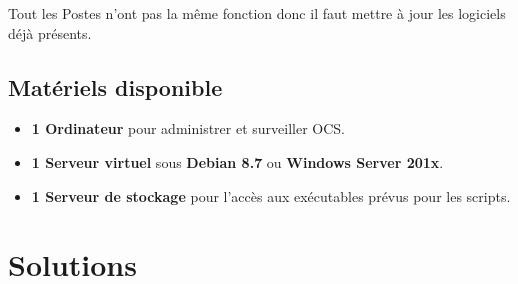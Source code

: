 \documentclass[11pt,a4paper,oneside]{article}
\begin{document}
Tout les Postes n'ont pas la même fonction donc il faut mettre à jour les logiciels déjà présents.

\subsection{Matériels disponible}
\begin{itemize}
	\item \textbf{1 Ordinateur} pour administrer et surveiller OCS.
	\item \textbf{1 Serveur virtuel} sous \textbf{Debian 8.7} ou \textbf{Windows Server 201x}.
	\item \textbf{1 Serveur de stockage} pour l'accès aux exécutables prévus pour les scripts. 
\end{itemize}
\newpage

\section{Solutions}
\end{document}
